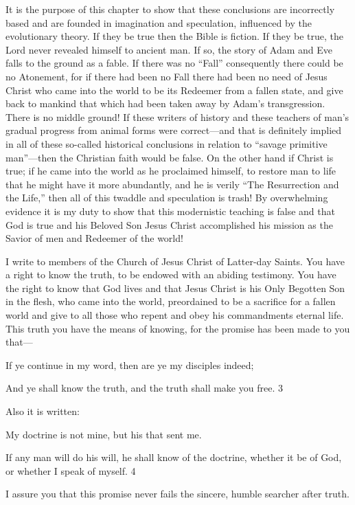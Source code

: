 It is the purpose of this chapter to show that these conclusions are incorrectly based and are
founded in imagination and speculation, influenced by the evolutionary theory. If they be
true then the Bible is fiction. If they be true, the Lord never revealed himself to ancient man.
If so, the story of Adam and Eve falls to the ground as a fable. If there was no ``Fall''
consequently there could be no Atonement, for if there had been no Fall there had been no
need of Jesus Christ who came into the world to be its Redeemer from a fallen state, and give
back to mankind that which had been taken away by Adam's transgression. There is no
middle ground! If these writers of history and these teachers of man's gradual progress from
animal forms were correct—and that is definitely implied in all of these so-called historical
conclusions in relation to ``savage primitive man''—then the Christian faith would be false.
On the other hand if Christ is true; if he came into the world as he proclaimed himself, to
restore man to life that he might have it more abundantly, and he is verily ``The Resurrection
and the Life,'' then all of this twaddle and speculation is trash! By overwhelming evidence it
is my duty to show that this modernistic teaching is false and that God is true and his
Beloved Son Jesus Christ accomplished his mission as the Savior of men and Redeemer of
the world!

I write to members of the Church of Jesus Christ of Latter-day Saints. You have a right to
know the truth, to be endowed with an abiding testimony. You have the right to know that
God lives and that Jesus Christ is his Only Begotten Son in the flesh, who came into the
world, preordained to be a sacrifice for a fallen world and give to all those who repent and
obey his commandments eternal life. This truth you have the means of knowing, for the
promise has been made to you that—

If ye continue in my word, then are ye my disciples indeed;

And ye shall know the truth, and the truth shall make you free. 3

Also it is written:

My doctrine is not mine, but his that sent me.

If any man will do his will, he shall know of the doctrine, whether it be of God, or whether I
speak of myself. 4

I assure you that this promise never fails the sincere, humble searcher after truth.

